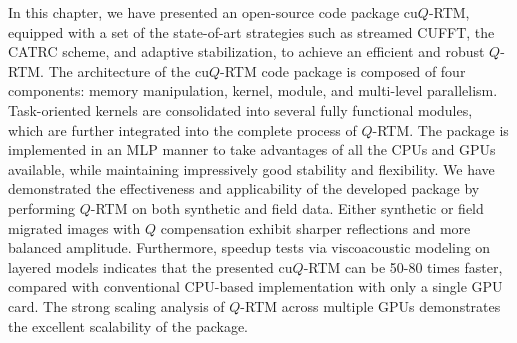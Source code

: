 In this chapter, we have presented an open-source code package cu$Q$-RTM, equipped with a set of the state-of-art strategies such as streamed CUFFT, the CATRC scheme, and adaptive stabilization, to achieve an efficient and robust $Q$-RTM. The architecture of the cu$Q$-RTM code package is composed of four components: memory manipulation, kernel, module, and multi-level parallelism. Task-oriented kernels are consolidated into several fully functional modules, which are further integrated into the complete process of $Q$-RTM. The package is implemented in an MLP manner to take advantages of all the CPUs and GPUs available, while maintaining impressively good stability and flexibility. We have demonstrated the effectiveness and applicability of the developed package by performing $Q$-RTM on both synthetic and field data. Either synthetic or field migrated images with $Q$ compensation exhibit sharper reflections and more balanced amplitude. Furthermore, speedup tests via viscoacoustic modeling on layered models indicates that the presented cu$Q$-RTM can be 50-80 times faster, compared with  conventional CPU-based implementation with only a single GPU card. The strong scaling analysis of $Q$-RTM across multiple GPUs demonstrates the excellent scalability of the package.






\newpage

